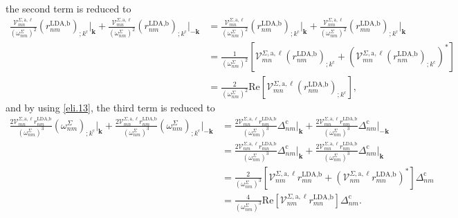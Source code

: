 the second term is reduced to
\begin{align}\label{second_term_gen_deriv}
    \frac{\mathcal{V}^{\Sigma,\text{a},\ell}_{mn}}{(\omega^{\Sigma}_{nm})^{2}}
    \left(r^{\text{LDA,b}}_{nm}\right)_{;k^{\text{c}}}\vert_{\mathbf{k}}
+   \frac{\mathcal{V}^{\Sigma,\text{a},\ell}_{mn}}{(\omega^{\Sigma}_{nm})^{2}}
    \left(r^{\text{LDA,b}}_{nm}\right)_{;k^{\text{c}}}\vert_{-\mathbf{k}}
&=  \frac{\mathcal{V}^{\Sigma,\text{a},\ell}_{mn}}{(\omega^{\Sigma}_{nm})^{2}}
    \left(r^{\text{LDA,b}}_{nm}\right)_{;k^{\text{c}}}\vert_{\mathbf{k}}
+   \frac{\mathcal{V}^{\Sigma,\text{a},\ell}_{nm}}{(\omega^{\Sigma}_{nm})^{2}}
    \left(r^{\text{LDA,b}}_{mn}\right)_{;k^{\text{c}}}\vert_{\mathbf{k}}
    \nonumber\\
&=  \frac{1}{(\omega^{\Sigma}_{nm})^{2}}
    \left[\mathcal{V}^{\Sigma,\text{a},\ell}_{mn}
    \left(r^{\text{LDA,b}}_{nm}\right)_{;k^{\text{c}}}
+   \left(\mathcal{V}^{\Sigma,\text{a},\ell}_{mn}
    \left(r^{\text{LDA,b}}_{nm}\right)_{;k^{\text{c}}}\right)^{*}\right]
    \nonumber\\
&=  \frac{2}{(\omega^{\Sigma}_{nm})^{2}}\mathrm{Re}
    \left[\mathcal{V}^{\Sigma,\text{a},\ell}_{mn}
    \left(r^{\text{LDA,b}}_{nm}\right)_{;k^{\text{c}}}\right],
\end{align}
and by using \eqref{eli.13}, the third term is reduced to
\begin{align}\label{third_term_gen_deriv}
    \frac{2\mathcal{V}^{\Sigma,\text{a},\ell}_{mn}
    r^{\text{LDA,b}}_{nm}}{(\omega^{\Sigma}_{nm})^{3}}
    \left(\omega^{\Sigma}_{nm}\right)_{;k^{\text{c}}}\vert_{\mathbf{k}}
+   \frac{2\mathcal{V}^{\Sigma,\text{a},\ell}_{mn}
    r^{\text{LDA,b}}_{nm}}{(\omega^{\Sigma}_{nm})^{3}}
    \left(\omega^{\Sigma}_{nm}\right)_{;k^{\text{c}}}\vert_{-\mathbf{k}}
&=  \frac{2\mathcal{V}^{\Sigma,\text{a},\ell}_{mn}
    r^{\text{LDA,b}}_{nm}}{(\omega^{\Sigma}_{nm})^{3}}
    \Delta_{nm}^{\text{c}}\vert_{\mathbf{k}}
+   \frac{2\mathcal{V}^{\Sigma,\text{a},\ell}_{mn}
    r^{\text{LDA,b}}_{nm}}{(\omega^{\Sigma}_{nm})^{3}}
    \Delta_{nm}^{\text{c}}\vert_{-\mathbf{k}}\nonumber\\
&=  \frac{2\mathcal{V}^{\Sigma,\text{a},\ell}_{nm}
    r^{\text{LDA,b}}_{mn}}{(\omega^{\Sigma}_{nm})^{3}}
    \Delta_{nm}^{\text{c}}\vert_{\mathbf{k}}
+   \frac{2\mathcal{V}^{\Sigma,\text{a},\ell}_{mn}
    r^{\text{LDA,b}}_{nm}}{(\omega^{\Sigma}_{nm})^{3}}
    \Delta_{nm}^{\text{c}}\vert_{\mathbf{k}}\nonumber\\
&=  \frac{2}{(\omega^{\Sigma}_{nm})^{3}}
    \left[\mathcal{V}^{\Sigma,\text{a},\ell}_{nm}r^{\text{LDA,b}}_{mn}
+   \left(\mathcal{V}^{\Sigma,\text{a},\ell}_{nm}
    r^{\text{LDA,b}}_{mn}\right)^{*}\right]\Delta_{nm}^{\text{c}}\nonumber\\
&=  \frac{4}{(\omega^{\Sigma}_{nm})^{3}}\mathrm{Re}
    \left[\mathcal{V}^{\Sigma,\text{a},\ell}_{nm}r^{\text{LDA,b}}_{mn}\right]
    \Delta_{nm}^{\text{c}}.
\end{align}

